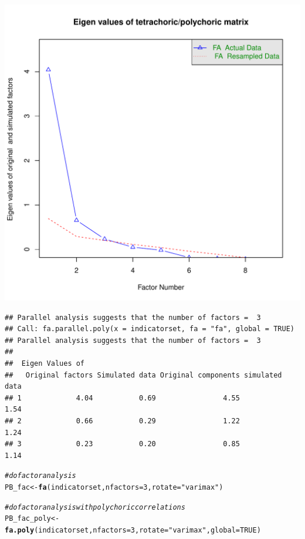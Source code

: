 \documentclass{article}\usepackage[]{graphicx}\usepackage[]{color}
\makeatletter
\def\maxwidth{ %
  \ifdim\Gin@nat@width>\linewidth
    \linewidth
  \else
    \Gin@nat@width
  \fi
}
\newcommand{\hlnum}[1]{\textcolor[rgb]{0.686,0.059,0.569}{#1}}%
\newcommand{\hlstr}[1]{\textcolor[rgb]{0.192,0.494,0.8}{#1}}%
\newcommand{\hlcom}[1]{\textcolor[rgb]{0.678,0.584,0.686}{\textit{#1}}}%
\newcommand{\hlstd}[1]{\textcolor[rgb]{0.345,0.345,0.345}{#1}}%
\newcommand{\hlkwb}[1]{\textcolor[rgb]{0.69,0.353,0.396}{#1}}%
\newcommand{\hlkwc}[1]{\textcolor[rgb]{0.333,0.667,0.333}{#1}}%
\newcommand{\hlkwd}[1]{\textcolor[rgb]{0.737,0.353,0.396}{\textbf{#1}}}%
\newenvironment{kframe}{%
 \def\at@end@of@kframe{}%
 \ifinner\ifhmode%
  \def\at@end@of@kframe{\end{minipage}}%
  \begin{minipage}{\columnwidth}%
 \fi\fi%
 \def\FrameCommand##1{\hskip\@totalleftmargin \hskip-\fboxsep
 \colorbox{shadecolor}{##1}\hskip-\fboxsep
     \hskip-\linewidth \hskip-\@totalleftmargin \hskip\columnwidth}%
 \MakeFramed {\advance\hsize-\width
   \@totalleftmargin\z@ \linewidth\hsize
   \@setminipage}}%
 {\par\unskip\endMakeFramed%
 \at@end@of@kframe}
\newenvironment{knitrout}{}{} %
\makeatother
\begin{document}
\begin{knitrout}
\includegraphics[width=\maxwidth]{figure/psych-2} 
\begin{kframe}\begin{verbatim}
## Parallel analysis suggests that the number of factors =  3
## Call: fa.parallel.poly(x = indicatorset, fa = "fa", global = TRUE)
## Parallel analysis suggests that the number of factors =  3
## 
##  Eigen Values of 
##   Original factors Simulated data Original components simulated data
## 1             4.04           0.69                4.55           1.54
## 2             0.66           0.29                1.22           1.24
## 3             0.23           0.20                0.85           1.14
\end{verbatim}
\begin{alltt}
\hlcom{#do factor analysis}
\hlstd{PB_fac} \hlkwb{<-} \hlkwd{fa}\hlstd{(indicatorset,} \hlkwc{nfactors}\hlstd{=}\hlnum{3}\hlstd{,} \hlkwc{rotate}\hlstd{=}\hlstr{"varimax"}\hlstd{)}

\hlcom{#do factor analysis with polychoric correlations}
\hlstd{PB_fac_poly} \hlkwb{<-} \hlkwd{fa.poly}\hlstd{(indicatorset,} \hlkwc{nfactors}\hlstd{=}\hlnum{3}\hlstd{,} \hlkwc{rotate}\hlstd{=}\hlstr{"varimax"}\hlstd{,}\hlkwc{global}\hlstd{=}\hlnum{TRUE}\hlstd{)}


\end{alltt}
\end{kframe}
\end{knitrout}
\end{document}
